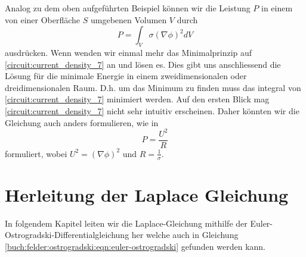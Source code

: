 



Analog zu dem oben aufgeführten Beispiel können wir die Leistung $P$ in einem von einer Oberfläche $S$ umgebenen Volumen $V$ durch 
\begin{equation}
	P=\int_V \sigma(\nabla \phi)^2 d V
	\label{circuit:current_density_7}
\end{equation}
ausdrücken. Wenn wenden wir einmal mehr das Minimalprinzip auf \eqref{circuit:current_density_7} an und lösen es. Dies gibt uns anschliessend die Lösung für die minimale Energie in einem zweidimensionalen oder dreidimensionalen Raum. D.h. um das Minimum zu finden muss das integral von \eqref{circuit:current_density_7} minimiert werden. Auf den ersten Blick mag \eqref{circuit:current_density_7} nicht sehr intuitiv erscheinen. Daher könnten wir die Gleichung auch anders formulieren, wie in 
\begin{equation}
	P=\frac{U^2}{R}
	\label{circuit:current_density_8}
\end{equation}
formuliert, wobei $U^2=\left( \nabla \phi \right)^2$ und $R=\frac{1}{\sigma}$.


\section{Herleitung der Laplace Gleichung}
In folgendem Kapitel leiten wir die Laplace-Gleichung mithilfe der Euler-Ostrogradski-Differentialgleichung her welche auch in Gleichung \eqref{buch:felder:ostrogradski:eqn:euler-ostrogradski} gefunden werden kann.

